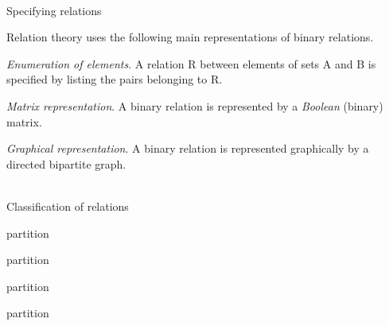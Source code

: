 \begin{frame}{\\Specifying relations}



	\topline
	\justifying

	Relation theory uses the following main representations of binary relations.\\

	\begin{textitemize}
		\item \textit{Enumeration of elements}. A relation R between elements of sets A and B is specified by listing the pairs belonging to R.

		\item
		\textit{Matrix representation}. A binary relation is represented by a \textit{Boolean} (binary) matrix.

		\item \textit{Graphical representation}. A binary relation is represented graphically by a directed bipartite graph.

	\end{textitemize}

\end{frame}

\begin{frame}{\\Classification of relations}

	\topline
	\justifying
	\footnotesize

	\begin{SCn}

		\begin{scnrelfromset}{partition}
		\end{scnrelfromset}

		\begin{scnrelfromset}{partition}
		\end{scnrelfromset}

		\begin{scnrelfromset}{partition}
		\end{scnrelfromset}

		\begin{scnrelfromset}{partition}
		\end{scnrelfromset}

	\end{SCn}
\vspace{-2em}
\end{frame}

